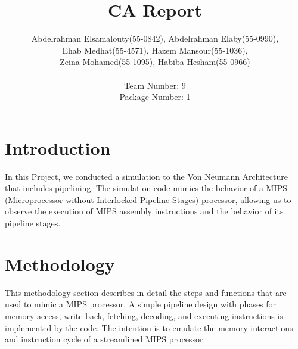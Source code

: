 \documentclass{article}
\title{CA Report}
\author{
    Abdelrahman Elsamalouty(55-0842), Abdelrahman Elaby(55-0990),\\
    Ehab Medhat(55-4571), Hazem Mansour(55-1036),\\
    Zeina Mohamed(55-1095), Habiba Hesham(55-0966)\\
   \\
    Team Number: 9\\
    Package Number: 1
    \date{}
}
\begin{document}
\maketitle
\section{Introduction}

In this Project, we conducted a simulation to the Von Neumann Architecture that includes pipelining. The simulation code mimics the behavior of a MIPS (Microprocessor without Interlocked Pipeline Stages) processor, allowing us to observe the execution of MIPS assembly instructions and the behavior of its pipeline stages.

\section{Methodology}

This methodology section describes in detail the steps and functions that are used to mimic a MIPS processor. A simple pipeline design with phases for memory access, write-back, fetching, decoding, and executing instructions is implemented by the code. The intention is to emulate the memory interactions and instruction cycle of a streamlined MIPS processor.
\end{document}
